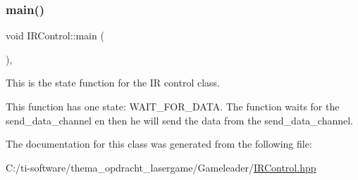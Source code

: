 \subsubsection{\texorpdfstring{main()}{main()}\hspace{0.1cm}{\footnotesize\ttfamily [2/2]}}
{\footnotesize\ttfamily void I\+R\+Control\+::main (\begin{DoxyParamCaption}{ }\end{DoxyParamCaption})\hspace{0.3cm}{\ttfamily [inline]}, {\ttfamily [override]}}



This is the state function for the IR control class. 

This function has one state\+: W\+A\+I\+T\+\_\+\+F\+O\+R\+\_\+\+D\+A\+TA. The function waits for the send\+\_\+data\+\_\+channel en then he will send the data from the send\+\_\+data\+\_\+channel. 

The documentation for this class was generated from the following file\+:\begin{DoxyCompactItemize}
\item 
C\+:/ti-\/software/thema\+\_\+opdracht\+\_\+lasergame/\+Gameleader/\mbox{\hyperlink{_gameleader_2_i_r_control_8hpp}{I\+R\+Control.\+hpp}}\end{DoxyCompactItemize}

